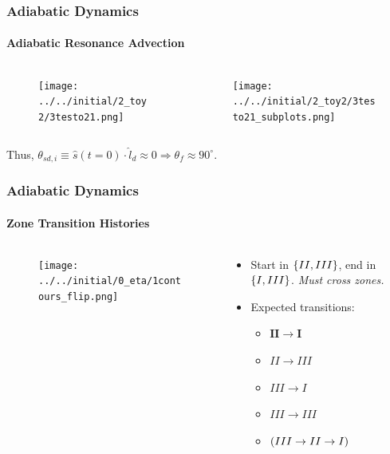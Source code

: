 \documentclass[dvipsnames]{beamer}
\DeclarePairedDelimiter\p{\lparen}{\rparen}
\DeclarePairedDelimiter\z{\lbrace}{\rbrace}
\begin{document}
\begin{frame}
    \frametitle{Adiabatic Dynamics}
    \framesubtitle{Adiabatic Resonance Advection}

    \begin{columns}
        \begin{column}{0.5\textwidth}
            \begin{figure}[t]
                \centering
                \texttt{[image: ../../initial/2\_toy2/3testo21.png]}
            \end{figure}
        \end{column}
        \begin{column}{0.5\textwidth}
            \begin{figure}[t]
                \centering
                \texttt{[image: ../../initial/2\_toy2/3testo21\_subplots.png]}
            \end{figure}
        \end{column}
    \end{columns}
    Thus, $\theta_{sd, i} \equiv \hat{s}(t = 0) \cdot \hat{l}_d \approx 0
    \Rightarrow \theta_f \approx 90^\circ$.
\end{frame}

\begin{frame}
    \frametitle{Adiabatic Dynamics}
    \framesubtitle{Zone Transition Histories}

    \begin{columns}
        \begin{column}{0.5\textwidth}
            \begin{figure}
                \centering
                \texttt{[image: ../../initial/0\_eta/1contours\_flip.png]}
            \end{figure}
        \end{column}
        \begin{column}{0.5\textwidth}
            \begin{itemize}
                \item Start in $\z*{II, III}$, end in $\z*{I, III}$.
                    \emph{Must cross zones.}

                \item Expected transitions:
                    \begin{itemize}
                        \item $\mathbf{II \to I}$
                        \item $II \to III$
                        \item $III \to I$
                        \item $III \to III$
                        \item $\p*{III \to II \to I}$
                    \end{itemize}
            \end{itemize}
        \end{column}
    \end{columns}
\end{frame}
\end{document}
